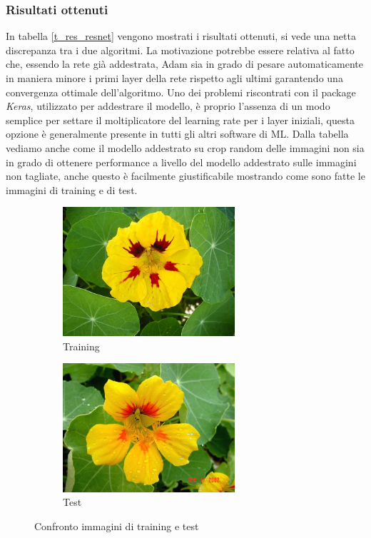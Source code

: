 \subsubsection{Risultati ottenuti}
In tabella \ref{t_res_resnet} vengono mostrati i risultati ottenuti, si vede una netta discrepanza tra i due algoritmi. La motivazione potrebbe essere relativa al fatto che, essendo la rete già addestrata, Adam sia in grado di pesare automaticamente in maniera minore i primi layer della rete rispetto agli ultimi garantendo una convergenza ottimale dell'algoritmo. Uno dei problemi riscontrati con il package \textit{Keras}, utilizzato per addestrare il modello, è proprio l'assenza di un modo semplice per settare il moltiplicatore del learning rate per i layer iniziali, questa opzione è generalmente presente in tutti gli altri software di ML. Dalla tabella vediamo anche come il modello addestrato su crop random delle immagini non sia in grado di ottenere performance a livello del modello addestrato sulle immagini non tagliate, anche questo è facilmente giustificabile mostrando come sono fatte le immagini di training e di test.

\begin{figure}[H]
  \begin{subfigure}[b]{0.45\textwidth}
  \centering
    \includegraphics[width=0.7\textwidth]{images/img_train}
    \caption{Training}
  \end{subfigure}
   \hfill
  \begin{subfigure}[b]{0.45\textwidth}
  \centering
    \includegraphics[width=0.7\textwidth]{images/img_test}
    \caption{Test}
  \end{subfigure}
  \caption{Confronto immagini di training e test}
  \vspace{-5mm}
  \label{fig_train_test}
\end{figure}

